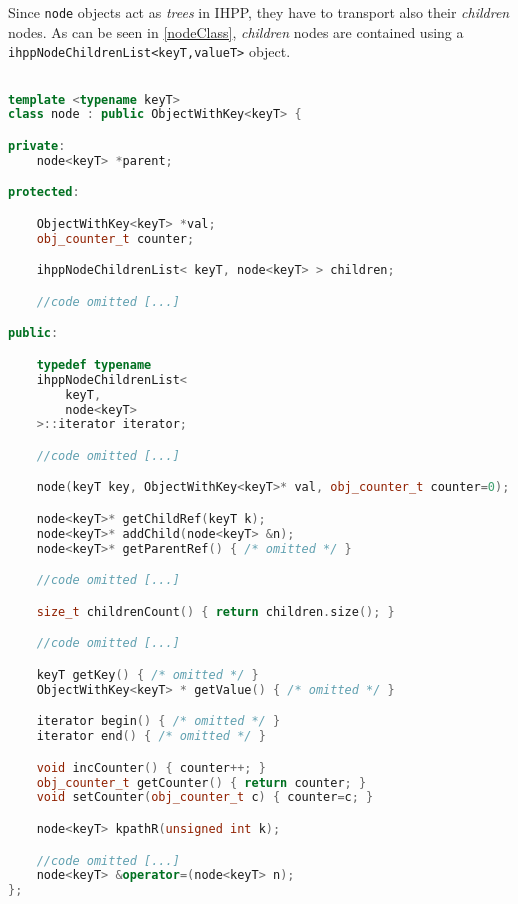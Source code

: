 \documentclass[a4paper,10pt]{report}
\begin{document}
Since \verb|node| objects act as \emph{trees} in IHPP, they have to transport
also their \emph{children} nodes. As can be seen in \cref{nodeClass},
\emph{children} nodes are contained using a
\verb|ihppNodeChildrenList<keyT,valueT>| object.

\begin{lstlisting}[language=C++,
	caption={partial definition of \texttt{node<keyT>} class},
	label=nodeClass, frame=leftline]

template <typename keyT>
class node : public ObjectWithKey<keyT> {

private:
	node<keyT> *parent;

protected:

	ObjectWithKey<keyT> *val;
	obj_counter_t counter;

	ihppNodeChildrenList< keyT, node<keyT> > children;

	//code omitted [...]

public:

	typedef typename
	ihppNodeChildrenList<
		keyT,
        node<keyT>
    >::iterator iterator;

	//code omitted [...]

	node(keyT key, ObjectWithKey<keyT>* val, obj_counter_t counter=0);

	node<keyT>* getChildRef(keyT k);
	node<keyT>* addChild(node<keyT> &n);
	node<keyT>* getParentRef() { /* omitted */ }

	//code omitted [...]

	size_t childrenCount() { return children.size(); }

	//code omitted [...]

	keyT getKey() { /* omitted */ }
	ObjectWithKey<keyT> * getValue() { /* omitted */ }

	iterator begin() { /* omitted */ }
	iterator end() { /* omitted */ }

	void incCounter() { counter++; }
	obj_counter_t getCounter() { return counter; }
	void setCounter(obj_counter_t c) { counter=c; }

	node<keyT> kpathR(unsigned int k);

	//code omitted [...]
	node<keyT> &operator=(node<keyT> n);
};

\end{lstlisting}
\end{document}
